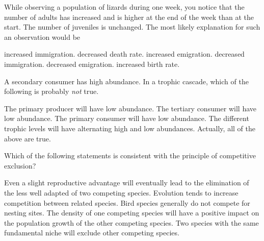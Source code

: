 
\question

\begin{choices}
\correctchoice  %
\choice  %
\choice  %
\choice  %
\choice  %
\end{choices}


\question
While observing a population of lizards during one week, you notice that the number of adults has increased and is higher at the end of the week than at the start. The number of juveniles is unchanged. The most likely explanation for such an observation would be 

\begin{choices}
\correctchoice increased immigration.  %
\choice decreased death rate. %
\choice increased emigration.  %
\choice decreased immigration. %
\choice decreased emigration.  %
\choice increased birth rate.  %
\end{choices}
	
\question
A secondary consumer has high abundance. In a trophic cascade, which of the following is probably \emph{not} true.
\begin{choices}
\correctchoice The primary producer will have low abundance. %
\choice The tertiary consumer will have low abundance. %
\choice The primary consumer will have low abundance. %
\choice The different trophic levels will have alternating high and low abundances. %
\choice Actually, all of the above are true. %
\end{choices}



\question
Which of the following statements is consistent with the principle of competitive exclusion?  

\begin{choices}
\correctchoice Even a slight reproductive advantage will eventually lead to the elimination of the less well adapted of two competing species. %
\choice Evolution tends to increase competition between related species.   %
\choice Bird species generally do not compete for nesting sites.  %
\choice The density of one competing species will have a positive impact on the population growth of the other competing species. %
\choice Two species with the same fundamental niche will exclude other competing species.   %
\end{choices}


